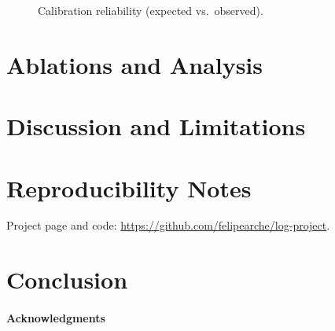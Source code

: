 \documentclass[10pt,twocolumn]{article}
\begin{document}
\begin{figure}[t]
  \centering
  \caption{Calibration reliability (expected vs.\ observed).}
  \label{fig:reliability}
\end{figure}

\section{Ablations and Analysis}

\section{Discussion and Limitations}

\section{Reproducibility Notes}
Project page and code: \url{https://github.com/felipearche/log-project}.

\section{Conclusion}

\paragraph{Acknowledgments}



\end{document}

